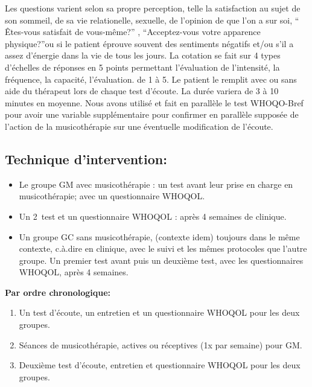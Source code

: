 	

Les questions varient selon sa propre perception, telle la satisfaction
au sujet de son  sommeil, de sa vie relationelle, sexuelle, de
l'opinion de que l'on a sur soi,  `` Êtes-vous satisfait de
vous-même?'' , ``Acceptez-vous votre apparence physique?''ou si le patient éprouve souvent des sentiments négatifs
et/ou s'il a assez d'énergie dans la vie de tous les jours.
La cotation se fait sur 4 types d'échelles de réponses en 5 points
permettant l'évaluation de l'intensité, la fréquence, la capacité, l'évaluation.
de 1 à 5.
Le patient le remplit avec ou sans aide du
thérapeut lors de chaque test
d'écoute. La durée variera de 3 à 10 minutes en
moyenne. 
Nous avons utilisé et fait en parallèle le test WHOQO-Bref pour avoir une variable supplémentaire pour confirmer en
parallèle supposée de l'action de la musicothérapie sur une éventuelle modification de l'écoute.


        	
 \subsection{Technique d'intervention:}


       
\begin{itemize}
\item Le groupe GM avec musicothérapie : un
          test avant leur prise en charge en musicothérapie; avec un questionnaire
          WHOQOL.
          
\item Un 2\ieme\ test et un questionnaire WHOQOL : après 4 semaines de
          clinique.
          
\item Un groupe GC sans musicothérapie, (contexte idem)
	toujours dans le même contexte, c.à.dire en clinique, avec le suivi et les mêmes protocoles que l'autre groupe. Un premier test avant
 puis un deuxième test, avec les questionnaires WHOQOL, après 4 semaines. 
\end{itemize}

\textbf{ Par ordre chronologique:}
 
\begin{enumerate} 
   \item Un test d'écoute, un entretien et un questionnaire
        WHOQOL pour les deux groupes.
    \item Séances de musicothérapie, actives ou réceptives (1x par
        semaine) pour GM.
    \item Deuxième test d'écoute, entretien et questionnaire
          WHOQOL pour les deux groupes.
\end{enumerate}

